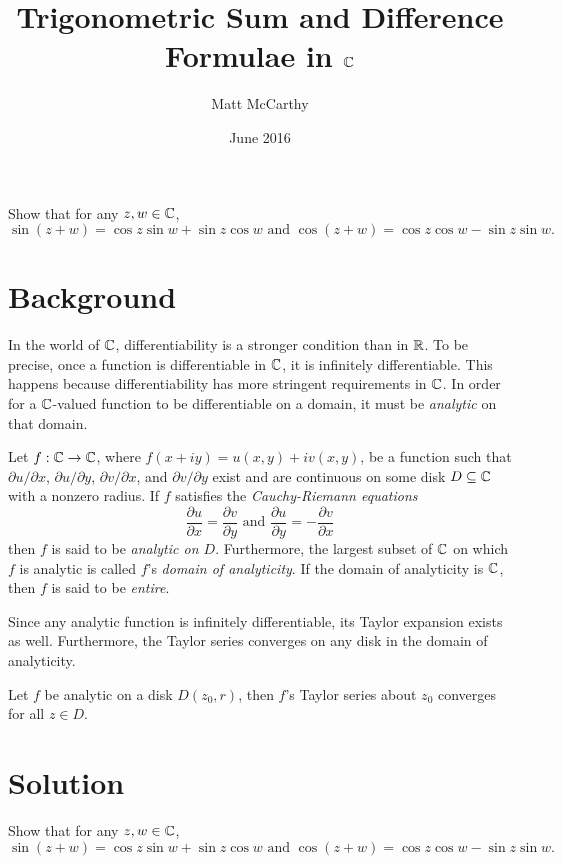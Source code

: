 \documentclass[notitlepage]{problem-solving}
\author{Matt McCarthy}
\title{Trigonometric Sum and Difference Formulae in $\mathbb{C}$}
\date{June 2016}
\begin{document}
\maketitle

\begin{problem*}
	Show that for any $z,w\in\mathbb{C}$,
	\[
		\sin(z+w)=\cos z\sin w+\sin z\cos w \text{ and } \cos(z+w)=\cos z\cos w - \sin z\sin w.
	\]
\end{problem*}

\section{Background}

In the world of $\mathbb{C}$, differentiability is a stronger condition than in $\mathbb{R}$.
To be precise, once a function is differentiable in $\mathbb{C}$, it is infinitely differentiable.
This happens because differentiability has more stringent requirements in $\mathbb{C}$.
In order for a $\mathbb{C}$-valued function to be differentiable on a domain, it must be \textit{analytic} on that domain.
\begin{definition}
	Let $f:\mathbb{C}\rightarrow\mathbb{C}$, where $f(x+iy)=u(x,y)+iv(x,y)$, be a function such that $\partial u/\partial x$, $\partial u/\partial y$, $\partial v/\partial x$, and $\partial v/\partial y$ exist and are continuous on some disk $D\subseteq\mathbb{C}$ with a nonzero radius.
	If $f$ satisfies the \textit{Cauchy-Riemann equations}
	\[
		\frac{\partial u}{\partial x} = \frac{\partial v}{\partial y} \text{ and } \frac{\partial u}{\partial y} = -\frac{\partial v}{\partial x}
	\]
	then $f$ is said to be \textit{analytic on $D$}.
	Furthermore, the largest subset of $\mathbb{C}$ on which $f$ is analytic is called $f$'s \textit{domain of analyticity}.
	If the domain of analyticity is $\mathbb{C}$, then $f$ is said to be \textit{entire}.
\end{definition}
Since any analytic function is infinitely differentiable, its Taylor expansion exists as well.
Furthermore, the Taylor series converges on any disk in the domain of analyticity.
\begin{thm}
	Let $f$ be analytic on a disk $D(z_0,r)$, then $f$'s Taylor series about $z_0$ converges for all $z\in D$.
\end{thm}

\section{Solution}

\begin{problem*}
	Show that for any $z,w\in\mathbb{C}$,
	\[
		\sin(z+w)=\cos z\sin w+\sin z\cos w \text{ and } \cos(z+w)=\cos z\cos w - \sin z\sin w.
	\]
\end{problem*}
\end{document}
